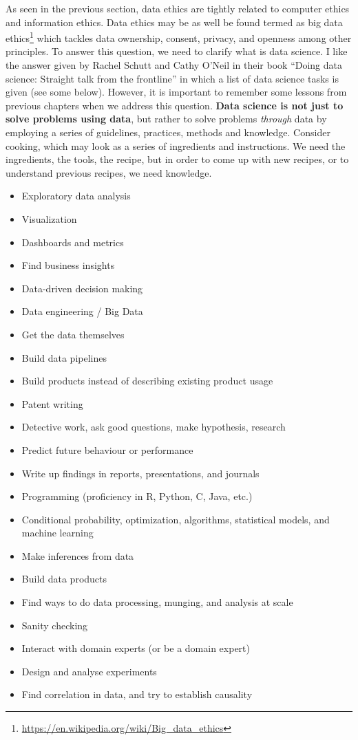 \documentclass[
  12pt,
]{book}
\providecommand{\tightlist}{%
  \setlength{\itemsep}{0pt}\setlength{\parskip}{0pt}}
\DeclareRobustCommand{\href}[2]{#2\footnote{\url{#1}}}
\begin{document}
As seen in the previous section, data ethics are tightly related to computer ethics and information ethics. Data ethics may be as well be found termed as \href{https://en.wikipedia.org/wiki/Big_data_ethics}{big data ethics} which tackles data ownership, consent, privacy, and openness among other principles. To answer this question, we need to clarify what is data science. I like the answer given by Rachel Schutt and Cathy O'Neil in their book ``Doing data science: Straight talk from the frontline'' \citep{o2013doing} in which a list of data science tasks is given (see some below). However, it is important to remember some lessons from previous chapters when we address this question. \textbf{Data science is not just to solve problems using data}, but rather to solve problems \emph{through} data by employing a series of guidelines, practices, methods and knowledge. Consider cooking, which may look as a series of ingredients and instructions. We need the ingredients, the tools, the recipe, but in order to come up with new recipes, or to understand previous recipes, we need knowledge.

\begin{itemize}
\tightlist
\item
  Exploratory data analysis
\item
  Visualization
\item
  Dashboards and metrics
\item
  Find business insights
\item
  Data-driven decision making
\item
  Data engineering / Big Data
\item
  Get the data themselves
\item
  Build data pipelines
\item
  Build products instead of describing existing product usage
\item
  Patent writing
\item
  Detective work, ask good questions, make hypothesis, research
\item
  Predict future behaviour or performance
\item
  Write up findings in reports, presentations, and journals
\item
  Programming (proficiency in R, Python, C, Java, etc.)
\item
  Conditional probability, optimization, algorithms, statistical models, and machine learning
\item
  Make inferences from data
\item
  Build data products
\item
  Find ways to do data processing, munging, and analysis at scale
\item
  Sanity checking
\item
  Interact with domain experts (or be a domain expert)
\item
  Design and analyse experiments
\item
  Find correlation in data, and try to establish causality
\end{itemize}
\end{document}

